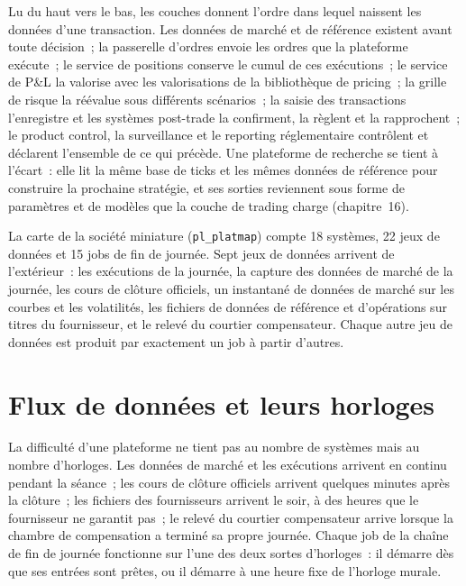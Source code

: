 Lu du haut vers le bas, les couches donnent l'ordre dans lequel naissent les données d'une transaction. Les données de marché et de référence existent avant toute
décision~; la passerelle d'ordres envoie les ordres que la plateforme exécute~; le service de positions conserve le cumul de ces exécutions~; le
service de P\&L la valorise avec les valorisations de la bibliothèque de pricing~; la grille de risque la réévalue sous différents scénarios~; la saisie des transactions l'enregistre et
les systèmes post-trade la confirment, la règlent et la rapprochent~; le product control, la surveillance et le reporting réglementaire contrôlent et déclarent
l'ensemble de ce qui précède. Une plateforme de recherche se tient à l'écart~: elle lit la même base de ticks et les mêmes données de référence pour construire la
prochaine stratégie, et ses sorties reviennent sous forme de paramètres et de modèles que la couche de trading charge (chapitre~16).

\begin{example}\label{ex:pl:the-platform-map:numbers}
La carte de la société miniature (\texttt{pl\_platmap}) compte 18 systèmes, 22 jeux de données et 15 jobs de fin de journée. Sept jeux de données
arrivent de l'extérieur~: les exécutions de la journée, la capture des données de marché de la journée, les cours de clôture officiels, un instantané
de données de marché sur les courbes et les volatilités, les fichiers de données de référence et d'opérations sur titres du fournisseur, et le relevé du courtier compensateur. Chaque
autre jeu de données est produit par exactement un job à partir d'autres.
\end{example}

\section{Flux de données et leurs horloges}

La difficulté d'une plateforme ne tient pas au nombre de systèmes mais au nombre d'horloges. Les données de marché et les exécutions arrivent en continu
pendant la séance~; les cours de clôture officiels arrivent quelques minutes après la clôture~; les fichiers des fournisseurs arrivent le soir, à des heures que le
fournisseur ne garantit pas~; le relevé du courtier compensateur arrive lorsque la chambre de compensation a terminé sa propre journée. Chaque job
de la chaîne de fin de journée fonctionne sur l'une des deux sortes d'horloges~: il démarre dès que ses entrées sont prêtes, ou il démarre à une heure fixe
de l'horloge murale.

